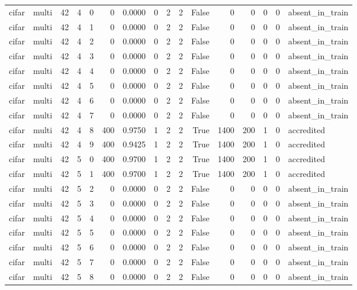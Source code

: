 \begin{tabular}{llrrrrrrrrrrrrrl}
cifar & multi & 42 & 4 & 0 & 0 & 0.0000 & 0 & 2 & 2 & False & 0 & 0 & 0 & 0 & absent\_in\_train \\
cifar & multi & 42 & 4 & 1 & 0 & 0.0000 & 0 & 2 & 2 & False & 0 & 0 & 0 & 0 & absent\_in\_train \\
cifar & multi & 42 & 4 & 2 & 0 & 0.0000 & 0 & 2 & 2 & False & 0 & 0 & 0 & 0 & absent\_in\_train \\
cifar & multi & 42 & 4 & 3 & 0 & 0.0000 & 0 & 2 & 2 & False & 0 & 0 & 0 & 0 & absent\_in\_train \\
cifar & multi & 42 & 4 & 4 & 0 & 0.0000 & 0 & 2 & 2 & False & 0 & 0 & 0 & 0 & absent\_in\_train \\
cifar & multi & 42 & 4 & 5 & 0 & 0.0000 & 0 & 2 & 2 & False & 0 & 0 & 0 & 0 & absent\_in\_train \\
cifar & multi & 42 & 4 & 6 & 0 & 0.0000 & 0 & 2 & 2 & False & 0 & 0 & 0 & 0 & absent\_in\_train \\
cifar & multi & 42 & 4 & 7 & 0 & 0.0000 & 0 & 2 & 2 & False & 0 & 0 & 0 & 0 & absent\_in\_train \\
cifar & multi & 42 & 4 & 8 & 400 & 0.9750 & 1 & 2 & 2 & True & 1400 & 200 & 1 & 0 & accredited \\
cifar & multi & 42 & 4 & 9 & 400 & 0.9425 & 1 & 2 & 2 & True & 1400 & 200 & 1 & 0 & accredited \\
cifar & multi & 42 & 5 & 0 & 400 & 0.9700 & 1 & 2 & 2 & True & 1400 & 200 & 1 & 0 & accredited \\
cifar & multi & 42 & 5 & 1 & 400 & 0.9700 & 1 & 2 & 2 & True & 1400 & 200 & 1 & 0 & accredited \\
cifar & multi & 42 & 5 & 2 & 0 & 0.0000 & 0 & 2 & 2 & False & 0 & 0 & 0 & 0 & absent\_in\_train \\
cifar & multi & 42 & 5 & 3 & 0 & 0.0000 & 0 & 2 & 2 & False & 0 & 0 & 0 & 0 & absent\_in\_train \\
cifar & multi & 42 & 5 & 4 & 0 & 0.0000 & 0 & 2 & 2 & False & 0 & 0 & 0 & 0 & absent\_in\_train \\
cifar & multi & 42 & 5 & 5 & 0 & 0.0000 & 0 & 2 & 2 & False & 0 & 0 & 0 & 0 & absent\_in\_train \\
cifar & multi & 42 & 5 & 6 & 0 & 0.0000 & 0 & 2 & 2 & False & 0 & 0 & 0 & 0 & absent\_in\_train \\
cifar & multi & 42 & 5 & 7 & 0 & 0.0000 & 0 & 2 & 2 & False & 0 & 0 & 0 & 0 & absent\_in\_train \\
cifar & multi & 42 & 5 & 8 & 0 & 0.0000 & 0 & 2 & 2 & False & 0 & 0 & 0 & 0 & absent\_in\_train \\

\end{tabular}
